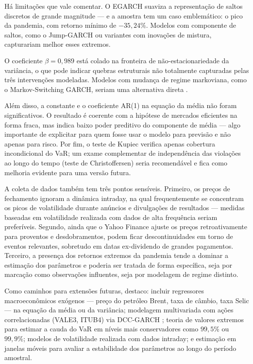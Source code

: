 \documentclass[12pt, a4paper]{article}
\begin{document}
Há limitações que vale comentar. O EGARCH suaviza a representação de saltos discretos de grande magnitude --- e a amostra tem um caso emblemático: o pico da pandemia, com retorno mínimo de $-35{,}24\%$. Modelos com componente de saltos, como o Jump-GARCH ou variantes com inovações de mistura, capturariam melhor esses extremos.

O coeficiente $\beta = 0{,}989$ está colado na fronteira de não-estacionariedade da variância, o que pode indicar quebras estruturais não totalmente capturadas pelas três intervenções modeladas. Modelos com mudança de regime markoviana, como o Markov-Switching GARCH, seriam uma alternativa direta \cite{morettin2020}.

Além disso, a constante e o coeficiente AR(1) na equação da média não foram significativos. O resultado é coerente com a hipótese de mercados eficientes na forma fraca, mas indica baixo poder preditivo do componente de média --- algo importante de explicitar para quem fosse usar o modelo para previsão e não apenas para risco. Por fim, o teste de Kupiec verifica apenas cobertura incondicional do VaR; um exame complementar de independência das violações ao longo do tempo (teste de Christoffersen) seria recomendável e fica como melhoria evidente para uma versão futura.

A coleta de dados também tem três pontos sensíveis. Primeiro, os preços de fechamento ignoram a dinâmica intraday, na qual frequentemente se concentram os picos de volatilidade durante anúncios e divulgações de resultados --- medidas baseadas em volatilidade realizada com dados de alta frequência seriam preferíveis. Segundo, ainda que o Yahoo Finance ajuste os preços retroativamente para proventos e desdobramentos, podem ficar descontinuidades em torno de eventos relevantes, sobretudo em datas ex-dividendo de grandes pagamentos. Terceiro, a presença dos retornos extremos da pandemia tende a dominar a estimação dos parâmetros e poderia ser tratada de forma específica, seja por marcação como observações influentes, seja por modelagem de regime distinto.

Como caminhos para extensões futuras, destaco: incluir regressores macroeconômicos exógenos --- preço do petróleo Brent, taxa de câmbio, taxa Selic --- na equação da média ou da variância; modelagem multivariada com ações correlacionadas (VALE3, ITUB4) via DCC-GARCH \cite{morettin2020}; teoria de valores extremos para estimar a cauda do VaR em níveis mais conservadores como $99{,}5\%$ ou $99{,}9\%$; modelos de volatilidade realizada com dados intraday; e estimação em janelas móveis para avaliar a estabilidade dos parâmetros ao longo do período amostral.
\end{document}
